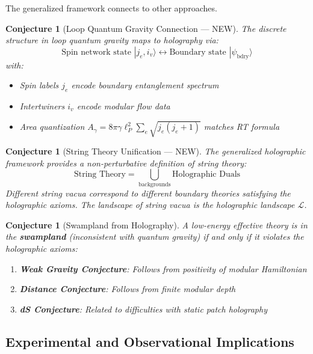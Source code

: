 \documentclass[12pt,a4paper]{article}
\newtheorem{conjecture}[theorem]{Conjecture}
\begin{document}
The generalized framework connects to other approaches.

\begin{conjecture}[Loop Quantum Gravity Connection --- NEW]
The discrete structure in loop quantum gravity maps to holography via:
\begin{equation}
\text{Spin network state } |j_e, i_v\rangle \longleftrightarrow \text{Boundary state } |\psi_{\text{bdry}}\rangle
\end{equation}
with:
\begin{itemize}
    \item Spin labels $j_e$ encode boundary entanglement spectrum
    \item Intertwiners $i_v$ encode modular flow data
    \item Area quantization $A_\gamma = 8\pi \gamma \ell_P^2 \sum_e \sqrt{j_e(j_e+1)}$ matches RT formula
\end{itemize}
\end{conjecture}

\begin{conjecture}[String Theory Unification --- NEW]
The generalized holographic framework provides a \textit{non-perturbative definition} of string theory:
\begin{equation}
\text{String Theory} = \bigcup_{\text{backgrounds}} \text{Holographic Duals}
\end{equation}
Different string vacua correspond to different boundary theories satisfying the holographic axioms. The landscape of string vacua is the holographic landscape $\mathcal{L}$.
\end{conjecture}

\begin{conjecture}[Swampland from Holography]
A low-energy effective theory is in the \textbf{swampland} (inconsistent with quantum gravity) if and only if it violates the holographic axioms:
\begin{enumerate}
    \item \textbf{Weak Gravity Conjecture}: Follows from positivity of modular Hamiltonian
    \item \textbf{Distance Conjecture}: Follows from finite modular depth
    \item \textbf{dS Conjecture}: Related to difficulties with static patch holography
\end{enumerate}
\end{conjecture}

\subsection{Experimental and Observational Implications}
\end{document}
